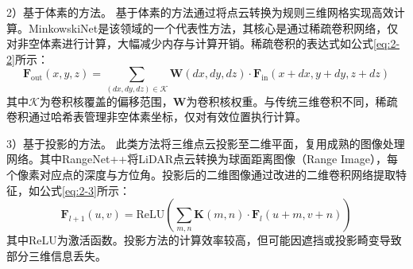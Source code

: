 2）基于体素的方法。
基于体素的方法通过将点云转换为规则三维网格实现高效计算。MinkowskiNet是该领域的一个代表性方法，其核心是通过稀疏卷积网络，仅对非空体素进行计算，大幅减少内存与计算开销。稀疏卷积的表达式如公式\eqref{eq:2-2}所示：
\begin{equation}
    \label{eq:2-2}
    \mathbf{F}_{\text{out}}(x,y,z) = \sum_{(dx,dy,dz) \in \mathcal{K}} \mathbf{W}(dx,dy,dz) \cdot \mathbf{F}_{\text{in}}(x+dx, y+dy, z+dz)
\end{equation}
其中$\mathcal{K}$为卷积核覆盖的偏移范围，$\mathbf{W}$为卷积核权重。与传统三维卷积不同，稀疏卷积通过哈希表管理非空体素坐标，仅对有效位置执行计算。%


3）基于投影的方法。
此类方法将三维点云投影至二维平面，复用成熟的图像处理网络。其中RangeNet++将LiDAR点云转换为球面距离图像（Range Image），每个像素对应点的深度与方位角。投影后的二维图像通过改进的二维卷积网络提取特征，如公式\eqref{eq:2-3}所示：
\begin{equation}
    \label{eq:2-3}
    \mathbf{F}_{l+1}(u,v) = \text{ReLU}\left(\sum_{m,n} \mathbf{K}(m,n) \cdot \mathbf{F}_l(u+m, v+n)\right)
\end{equation}
其中ReLU为激活函数。投影方法的计算效率较高，但可能因遮挡或投影畸变导致部分三维信息丢失。%

